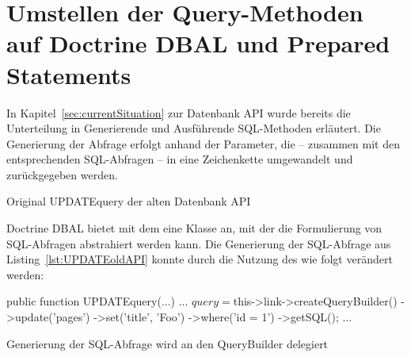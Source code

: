 \section{Umstellen der Query-Methoden auf Doctrine DBAL und Prepared Statements}
\label{prototype:sec:usingDoctrinePreparedStatements}

In Kapitel~\ref{sec:currentSituation} zur Datenbank API wurde bereits die Unterteilung in Generierende und Ausführende SQL-Methoden erläutert. Die Generierung der Abfrage erfolgt anhand der Parameter, die – zusammen mit den entsprechenden SQL-Abfragen – in eine Zeichenkette umgewandelt und zurückgegeben werden.

\begin{listing}[H]
\begin{phpcode}
public function UPDATEquery(
  $table,
  $where,
  array $fields_values,
  $no_quote_fields = FALSE
  ) {
  ...
    $fields = array();
	if (is_array($fields_values) && count($fields_values)) {
	  // Quote and escape values
	  $nArr = $this->fullQuoteArray(
	            $fields_values,
	            $table,
	            $no_quote_fields,
	            TRUE
	          );
	  foreach ($nArr as $k => $v) {
	    $fields[] = $k . '=' . $v;
	  }
	}

	$query = 'UPDATE ' . $table . ' SET ' . implode(',', $fields) .
		((string)$where !== '' ? ' WHERE ' . $where : '');
	...
	return $query;
  }
}
\end{phpcode}
\caption{Original UPDATEquery der alten Datenbank API}
\label{lst:UPDATEoldAPI}
\end{listing}

Doctrine DBAL bietet mit dem  eine Klasse an, mit der die Formulierung von SQL-Abfragen abstrahiert werden kann. Die Generierung der SQL-Abfrage aus Listing~\ref{lst:UPDATEoldAPI} konnte durch die Nutzung des  wie folgt verändert werden:

\begin{listing}[H]
\begin{phpcode}
public function UPDATEquery(...) {
...
  $query = $this->link->createQueryBuilder()
    ->update('pages')
    ->set('title', 'Foo')
    ->where('id = 1')
    ->getSQL();
...
}
\end{phpcode}
\caption{Generierung der SQL-Abfrage wird an den QueryBuilder delegiert}
\label{lst:createSqlByDirectCallToQueryBuilder}
\end{listing}

